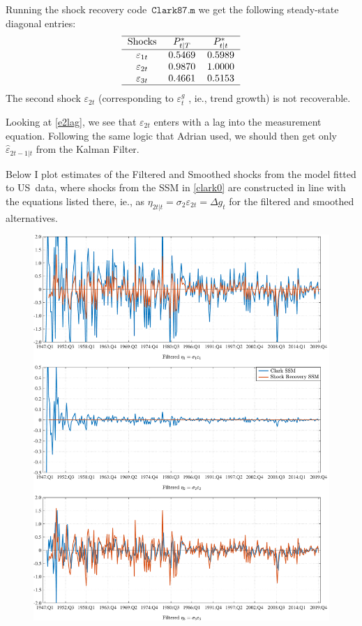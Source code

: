 \documentclass[a4paper,12pt]{article}
\begin{document}
Running the shock recovery code\ $\mathtt{Clark87.m}$ we get the following
steady-state diagonal entries:%
\begin{equation*}
\begin{tabular}{ccc}
\hline
Shocks & $P_{t|T}^{\ast }$ & $P_{t|t}^{\ast }$ \\ \hline
$\varepsilon _{1t}$ & $0.5469$ & $0.5989$ \\
$\varepsilon _{2t}$ & $0.9870$ & $1.0000$ \\
$\varepsilon _{3t}$ & $0.4661$ & $0.5153$ \\ \hline
\end{tabular}%
\end{equation*}%
The second shock $\varepsilon _{2t}$ (corresponding to $\varepsilon _{t}^{g}$%
, ie., trend growth) is not recoverable.

Looking at \ref{e2lag}, we see that $\varepsilon _{2t}$ enters with a lag
into the measurement equation. Following the same logic that Adrian used, we
should then get only $\hat{\varepsilon}_{2t-1|t}$ from the Kalman Filter.

Below I plot estimates of the Filtered and Smoothed shocks from the model
fitted to US\ data, where shocks from the SSM in \ref{clark0} are
constructed in line with the equations listed there, ie.,  as $\eta
_{2t|t}=\sigma _{2}\varepsilon _{2t}=\Delta g_{t}$ for the filtered and
smoothed alternatives.

\begin{figure}[p!]
\centering
\includegraphics[angle=00, width=1\textwidth,trim={0 0 0 0},clip]{Clark_SSM_Filtered}
\label{fig:KF}
\end{figure}
\end{document}
